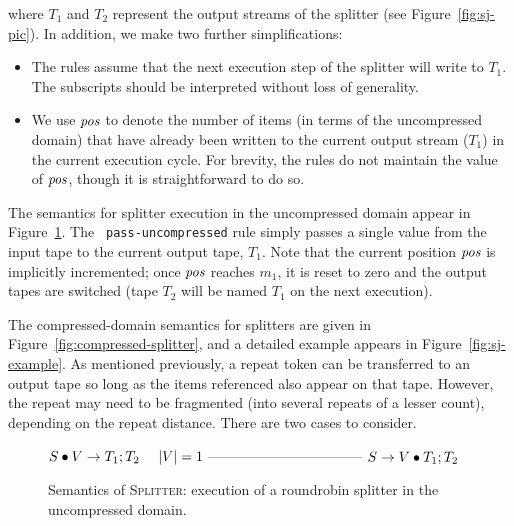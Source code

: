 \noindent where $T_1$ and $T_2$ represent the output streams of the
splitter (see Figure~\ref{fig:sj-pic}).  In addition, we make two
further simplifications:
\begin{itemize}

\item The rules assume that the next execution step of the splitter
  will write to $T_1$.  The subscripts should be interpreted without
  loss of generality.

\item We use $\mbox{\it pos}$ to denote the number of items (in terms of the
  uncompressed domain) that have already been written to the current
  output stream ($T_1$) in the current execution cycle.  For brevity,
  the rules do not maintain the value of $\mbox{\it pos}$, though it is
  straightforward to do so.

\end{itemize}

The semantics for splitter execution in the uncompressed domain appear
in Figure~\ref{fig:uncompressed-splitter}.  The {\tt
  pass-uncompressed} rule simply passes a single value from the input
tape to the current output tape, $T_1$.  Note that the current
position $\mbox{\it pos}$ is implicitly incremented; once $\mbox{\it pos}$ reaches $m_1$,
it is reset to zero and the output tapes are switched (tape $T_2$ will
be named $T_1$ on the next execution).

The compressed-domain semantics for splitters are given in
Figure~\ref{fig:compressed-splitter}, and a detailed example appears
in Figure~\ref{fig:sj-example}.  As mentioned previously, a repeat
token can be transferred to an output tape so long as the items
referenced also appear on that tape.  However, the repeat may need to
be fragmented (into several repeats of a lesser count), depending on
the repeat distance.  There are two cases to consider.

\begin{figure}[t]
$S \bullet V \rightarrow T_1; T_2~~~~|V|=1$\skiptopb
---------------------------------\skipbot
$S \rightarrow V \bullet T_1; T_2$
\caption{Semantics of \textsc{Splitter}: execution of a roundrobin
  splitter in the uncompressed domain.
 \protect\label{fig:uncompressed-splitter}}
\end{figure}

